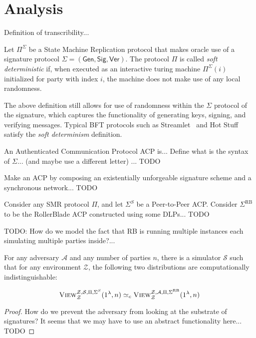 \section{Analysis}

\begin{definition}[Transcribability]
      Definition of transcribility...
\end{definition}

\begin{definition}
      Let $\Pi^\Sigma$ be a State Machine Replication protocol that makes
      oracle use of a signature protocol $\Sigma = (\textsf{Gen}, \textsf{Sig}, \textsf{Ver})$.
      The protocol $\Pi$ is called \emph{soft deterministic} if,
      when executed as an interactive turing machine $\Pi^\Sigma(i)$ initialized for party
      with index $i$, the machine does not make use of any local randomness.
\end{definition}

The above definition still allows for use of randomness within the $\Sigma$ protocol of the
signature, which captures the functionality of generating keys, signing, and verifying
messages. Typical BFT protocols such as Streamlet~\cite{streamlet} and Hot Stuff~\cite{hot-stuff}
satisfy the \emph{soft determinism} definition.

\begin{definition}
      An Authenticated Communication Protocol ACP is...
      Define what is the syntax of $\Sigma$... (and maybe use a different letter)
      ... TODO
\end{definition}

\begin{definition}
      Make an ACP by composing an existentially unforgeable signature scheme and
      a synchronous network... TODO
\end{definition}

\begin{conjecture}[Similarity]
      Consider any SMR protocol $\Pi$, and let $\Sigma^S$ be a
      Peer-to-Peer ACP. Consider $\Sigma^\mathrm{RB}$ to be the RollerBlade
      ACP constructed using some DLPs... TODO

      TODO: How do we model the fact that RB is running multiple instances
      each simulating multiple parties inside?...

      For any adversary $\mathcal{A}$ and any number of parties $n$,
      there is a simulator $\mathcal{S}$ such that
      for any environment $\mathcal{Z}$,
      the following two distributions
      are computationally indistinguishable:

      \[
            \textsc{View}^{\mathcal{Z},\mathcal{S},\Pi,\Sigma^S}_{\mathcal{Z}}(1^\lambda, n)
            \simeq_c
            \textsc{View}^{\mathcal{Z},\mathcal{A},\Pi,\Sigma^\mathrm{RB}}_{\mathcal{Z}}(1^\lambda, n)
      \]
\end{conjecture}
\begin{proof}
      How do we prevent the adversary from looking at the substrate of signatures?
      It seems that we may have to use an abstract functionality here... TODO
\end{proof}

